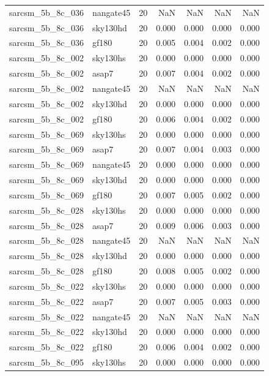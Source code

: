 \begin{tabular}{llrrrrr}
sarcsm\_5b\_8c\_036 & nangate45 & 20 & NaN & NaN & NaN & NaN \\
sarcsm\_5b\_8c\_036 & sky130hd & 20 & 0.000 & 0.000 & 0.000 & 0.000 \\
sarcsm\_5b\_8c\_036 & gf180 & 20 & 0.005 & 0.004 & 0.002 & 0.000 \\
sarcsm\_5b\_8c\_002 & sky130hs & 20 & 0.000 & 0.000 & 0.000 & 0.000 \\
sarcsm\_5b\_8c\_002 & asap7 & 20 & 0.007 & 0.004 & 0.002 & 0.000 \\
sarcsm\_5b\_8c\_002 & nangate45 & 20 & NaN & NaN & NaN & NaN \\
sarcsm\_5b\_8c\_002 & sky130hd & 20 & 0.000 & 0.000 & 0.000 & 0.000 \\
sarcsm\_5b\_8c\_002 & gf180 & 20 & 0.006 & 0.004 & 0.002 & 0.000 \\
sarcsm\_5b\_8c\_069 & sky130hs & 20 & 0.000 & 0.000 & 0.000 & 0.000 \\
sarcsm\_5b\_8c\_069 & asap7 & 20 & 0.007 & 0.004 & 0.003 & 0.000 \\
sarcsm\_5b\_8c\_069 & nangate45 & 20 & 0.000 & 0.000 & 0.000 & 0.000 \\
sarcsm\_5b\_8c\_069 & sky130hd & 20 & 0.000 & 0.000 & 0.000 & 0.000 \\
sarcsm\_5b\_8c\_069 & gf180 & 20 & 0.007 & 0.005 & 0.002 & 0.000 \\
sarcsm\_5b\_8c\_028 & sky130hs & 20 & 0.000 & 0.000 & 0.000 & 0.000 \\
sarcsm\_5b\_8c\_028 & asap7 & 20 & 0.009 & 0.006 & 0.003 & 0.000 \\
sarcsm\_5b\_8c\_028 & nangate45 & 20 & NaN & NaN & NaN & NaN \\
sarcsm\_5b\_8c\_028 & sky130hd & 20 & 0.000 & 0.000 & 0.000 & 0.000 \\
sarcsm\_5b\_8c\_028 & gf180 & 20 & 0.008 & 0.005 & 0.002 & 0.000 \\
sarcsm\_5b\_8c\_022 & sky130hs & 20 & 0.000 & 0.000 & 0.000 & 0.000 \\
sarcsm\_5b\_8c\_022 & asap7 & 20 & 0.007 & 0.005 & 0.003 & 0.000 \\
sarcsm\_5b\_8c\_022 & nangate45 & 20 & NaN & NaN & NaN & NaN \\
sarcsm\_5b\_8c\_022 & sky130hd & 20 & 0.000 & 0.000 & 0.000 & 0.000 \\
sarcsm\_5b\_8c\_022 & gf180 & 20 & 0.006 & 0.004 & 0.002 & 0.000 \\
sarcsm\_5b\_8c\_095 & sky130hs & 20 & 0.000 & 0.000 & 0.000 & 0.000 \\

\end{tabular}
